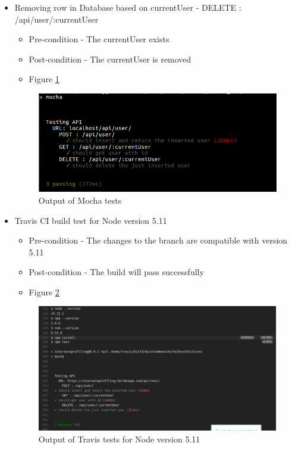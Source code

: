 \documentclass{article}
\begin{document}
\begin{itemize}
\item Removing row in Database based on currentUser - DELETE : /api/user/:currentUser
	\begin{itemize}
	\item Pre-condition - The currentUser exists
	\item Post-condition - The currentUser is removed 
	\item Figure \ref{fig:MochaTests}
	\end{itemize}	
	\begin{figure}[H]
  	\centering
      \includegraphics[width=\textwidth]{images/tests.png}
  	\caption{Output of Mocha tests}
  	\label{fig:MochaTests}
	\end{figure}


\item Travis CI build test for Node version 5.11
	\begin{itemize}
	\item Pre-condition - The changes to the branch are compatible with version 5.11
	\item Post-condition - The build will pass successfully 
	\item Figure \ref{fig:5_11}
	\end{itemize}	
	
	\begin{figure}[h]
  	\centering
      \includegraphics[width=\textwidth]{images/5_11.png}
  	\caption{Output of Travis tests for Node version 5.11}
  	\label{fig:5_11}
	\end{figure}


\end{itemize}
\end{document}
